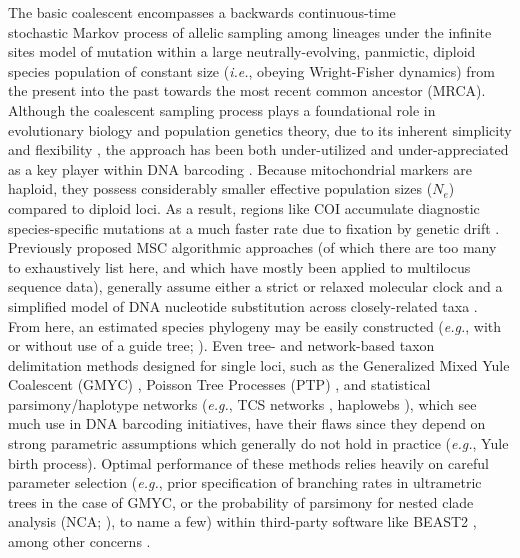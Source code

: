 \documentclass[12pt]{article}
\begin{document}
The basic coalescent \citep{kingman1982coalescent, kingman1982genealogy} encompasses a backwards continuous-time \\ stochastic Markov process of allelic sampling among lineages under the infinite sites model of mutation within a large neutrally-evolving, panmictic, diploid species population of constant size (\textit{i.e.}, obeying Wright-Fisher dynamics) from the present into the past towards the most recent common ancestor (MRCA). Although the coalescent sampling process plays a foundational role in evolutionary biology and population genetics theory, due to its inherent simplicity and flexibility \citep{rosenberg2002genealogical, degnan2009gene}, the approach has been both under-utilized and under-appreciated as a key player within DNA barcoding \citep{collins2014known, dowton2014preliminary, hubert2015dna, phillips2022lack}. Because mitochondrial markers are haploid, they possess considerably smaller effective population sizes ($N_e$) compared to diploid loci. As a result, regions like COI accumulate diagnostic species-specific mutations at a much faster rate due to fixation by genetic drift \citep{hubert2015dna, phillips2022lack}.  Previously proposed MSC algorithmic approaches (of which there are too many to exhaustively list here, and which have mostly been applied to multilocus sequence data), generally assume either a strict or relaxed molecular clock and a simplified model of DNA nucleotide substitution across closely-related taxa \citep{ho2014molecular, flouri2022bayesian}. From here, an estimated species phylogeny may be easily constructed (\textit{e.g.}, with or without use of a guide tree; \citet{rannala2003bayes, rannala2017efficient, yang2010bayesian, yang2014unguided, yang2017bayesian}). Even tree- and network-based taxon delimitation methods designed for single loci, such as the Generalized Mixed Yule Coalescent (GMYC) \citep{pons2006sequence, monaghan2009accelerated, fujisawa2013delimiting}, Poisson Tree Processes (PTP) \citep{zhang2013general, kapli2017multirate}, and statistical parsimony/haplotype networks (\textit{e.g.}, TCS networks \citep{templeton1992cladistic}, haplowebs \citep{dellicour2015delimiting, dellicour2018hitchhiker}), which see much use in DNA barcoding initiatives, have their flaws since they depend on strong parametric assumptions which generally do not hold in practice (\textit{e.g.}, Yule birth process). Optimal performance of these methods relies heavily on careful parameter selection (\textit{e.g.}, prior  specification of branching rates in ultrametric trees in the case of GMYC, or the probability of parsimony for nested clade analysis (NCA; \citet{templeton1998nested}), to name a few) \citep{hubert2024delimiting} within third-party software like BEAST2 \citep{bouckaert2019beast}, among other concerns \citep{talavera2013factors, tang2014effects, fonseca2021gmyc}. 
\end{document}
